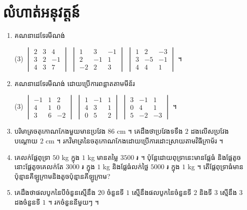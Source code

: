 \section*{លំហាត់អនុវត្តន៍}
\begin{enumerate}[1]
  \item គណនាដេទែរមីណង់
  \begin{tasks}(3)
    \task $\begin{vmatrix} 2 & 3 & 4\\ 3 & 2 & -1\\ 4 & 3 & 7 \end{vmatrix}$
    \task $\begin{vmatrix} 1 & 3 & -1\\ 2 & -1 & 1\\ -2 & 2 & 3 \end{vmatrix}$
    \task $\begin{vmatrix} 1 & 2 & -3\\ 3 & -5 & -1\\ 4 & 4 & 1 \end{vmatrix}$ ។
  \end{tasks}
  \item គណនាដេទែរមីណង់ ដោយប្រើការពន្លាតតាមមីន័រ
  \begin{tasks}(3)
    \task $\begin{vmatrix} -1 & 1 & 2\\ 4 & 1 & 0\\ 3 & 6 & -2 \end{vmatrix}$
    \task $\begin{vmatrix} 1 & -1 & 1\\ 4 & 3 & 1\\ 0 & 5 & 2 \end{vmatrix}$
    \task $\begin{vmatrix} 3 & -1 & 1\\ 0 & 4 & 1\\ 5 & -2 & -3 \end{vmatrix}$ ។
  \end{tasks}
  \item បរិមាត្រចតុកោណកែងមួយមានប្រវែង $86$ cm ។ គេដឹងថាប្រវែងទទឹង $2$ ដងលើសប្រវែងបណ្តោយ $2$ cm ។ រកវិមាត្រនៃចតុកោណកែងដោយប្រើការដោះស្រាយតាមវិធីក្រាម័រ ។
  \item គេលក់ផ្លែពុទ្រា $50$ kg ក្នុង $1$ kg មានតម្លៃ $3500$ ៛ ។ ប៉ុន្តែដោយពុទ្រានេះមានផ្លែធំ និងផ្លែតូច នោះផ្លែតូចគេលក់តែ $3000$ ៛ ក្នុង $1$ kg និងផ្លែធំលក់ថ្លៃ $5000$ ៛ ក្នុង $1$ kg ។ តើផ្លែពុទ្រាធំមានប៉ុន្មានគីឡូក្រាមនិងតូចប៉ុន្មានគីឡូក្រាម?
  \item គេដឹងថាផលបូកនៃបីចំនួនស្មើនឹង $20$ ចំនួនទី $1$ ស្មើនឹងផលបូកនៃចំនួនទី $2$ និងទី $3$ ស្មើនឹង $3$ ដងចំនួនទី $1$ ។ រកចំនួននីមួយៗ ។

\end{enumerate}
